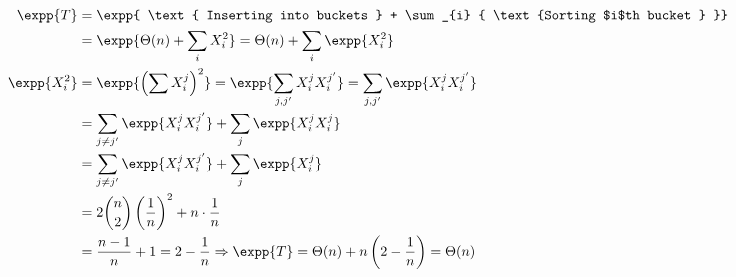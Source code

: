   \begin{equation*}
    \begin{split}
    \expp{T} &= \expp{  \text{ Inserting into buckets  }   +   \sum_{i} { \text{Sorting $i$th bucket  } }} \\ 
    & = \expp{ \Theta(n) +   \sum_{i} { X_{i}^{2}  }} = \Theta(n) +  \sum_{i}{ \expp{X_{i}^{2}} }  \\
  \expp{X_{i}^{2}} &= \expp{\left( \sum X_{i}^{j} \right)^{2}} = \expp{\sum_{j,j^{\prime}} X_{i}^{j} X_{i}^{j^{\prime}} } =  \sum_{j, j^{\prime}} \expp{X_{i}^{j} X_{i}^{j^{\prime}}} \\ 
  & = \sum_{j \neq j^{\prime}} \expp{X_{i}^{j} X_{i}^{j^{\prime}}} + \sum_{j} \expp{X_{i}^{j} X_{i}^{j}} \\
    & =  \sum_{j \neq j^{\prime}} \expp{X_{i}^{j} X_{i}^{j^{\prime}}} + \sum_{j} \expp{X_{i}^{j}}  \\
        & = 2 { n \choose 2  } \left( \frac{1}{n} \right)^{2} +  n\cdot \frac{1}{n} \\ 
        & = \frac{n-1}{n} + 1  = 2 - \frac{1}{n} \Rightarrow \expp{T} = \Theta(n) + n\left( 2 - \frac{1}{n} \right) = \Theta(n)
    \end{split}
  \end{equation*}




